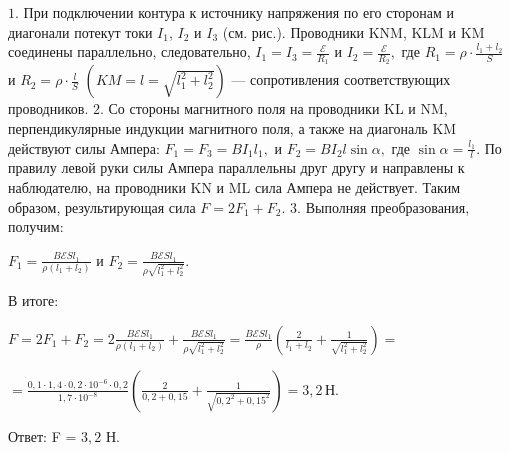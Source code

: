 \documentclass[12pt,a4paper]{article}
\begin{document}
{$1$.  При подключении контура к источнику напряжения по его сторонам и диагонали потекут токи $I_{1}$, $I_{2}$ и $I_{3}$ (см. рис.). Проводники KNM, KLM и KM соединены параллельно, следовательно, $I_1=I_3= \frac{\mathcal{E}}{R_1}$ и $I_2= \frac{\mathcal{E}}{R_2} ,$ где $R_1=\rho \cdot \frac{l_1 + l_2}{S}$ и $R_2=\rho \cdot \frac{l}{S}$ $( KM=l= \sqrt{l_1 ^2 + l_2 ^2} )$  — сопротивления соответствующих проводников.
$2$.  Со стороны магнитного поля на проводники KL и NM, перпендикулярные индукции магнитного поля, а также на диагональ KM действуют силы Ампера: $F_1=F_3=BI_1l_1,$ и $F_2=BI_2l \sin \alpha ,$ где $\sin \alpha = \frac{l_1}{l} .$ По правилу левой руки силы Ампера параллельны друг другу и направлены к наблюдателю, на проводники KN и ML сила Ампера не действует. Таким образом, результирующая сила $F = 2F_1 + F_2.$
$3$.  Выполняя преобразования, получим:

$F_1= \frac{B\mathcal{E} Sl_1}{\rho ( l_1 + l_2 )}$ и $F_2= \frac{B\mathcal{E} Sl_1}{\rho \sqrt{l_1 ^2 + l_2 ^2}} .$

В итоге:

$F=2F_1 + F_2=2 \frac{B\mathcal{E} Sl_1}{\rho ( l_1 + l_2 )} + \frac{B\mathcal{E} Sl_1}{\rho \sqrt{l_1 ^2 + l_2 ^2}} = \frac{B\mathcal{E} Sl_1}{\rho} ( \frac{2}{l_1 + l_2} + \frac{1}{\sqrt{l_1 ^2 + l_2 ^2}} ) =$

$= \frac{0{,}1 \cdot 1{,}4 \cdot 0{,}2 \cdot 10 ^{ - 6 } \cdot 0{,}2}{1{,}7 \cdot 10 ^{ - 8 }} ( \frac{2}{0{,}2 + 0{,}15} + \frac{1}{\sqrt{0{,}2 ^2 + 0{,}15 ^2}} ) =3{,}2 \,\text{Н}.$

Ответ: F  =  $3{,}2$ Н.
}
\end{document}
